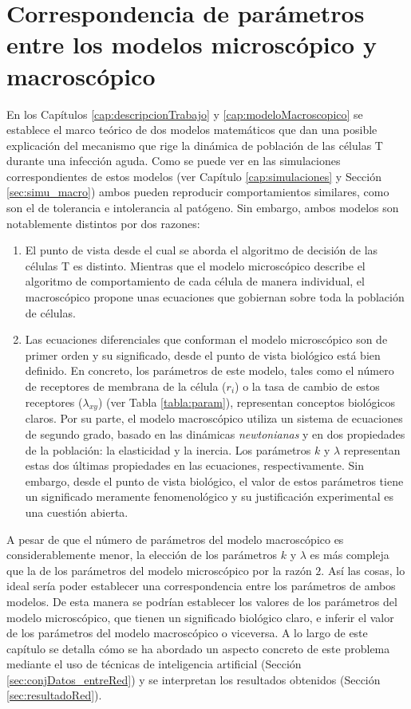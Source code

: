 \chapter{Correspondencia de parámetros entre los modelos microscópico y macroscópico}
\label{cap:redNeuronal}

En los Capítulos \ref{cap:descripcionTrabajo} y \ref{cap:modeloMacroscopico} se establece el marco teórico de dos modelos matemáticos que dan una posible explicación del mecanismo que rige la dinámica de población de las células T durante una infección aguda. Como se puede ver en las simulaciones correspondientes de estos modelos (ver Capítulo \ref{cap:simulaciones} y Sección \ref{sec:simu_macro}) ambos pueden reproducir comportamientos similares, como son el de tolerancia e intolerancia al patógeno. Sin embargo, ambos modelos son notablemente distintos por dos razones: 

\begin{enumerate}
	\item El punto de vista desde el cual se aborda el algoritmo de decisión de las células T es distinto. Mientras que el modelo microscópico describe el algoritmo de comportamiento de cada célula de manera individual, el macroscópico propone unas ecuaciones que gobiernan sobre toda la población de células. 
	
	\item Las ecuaciones diferenciales que conforman el modelo microscópico son de primer orden y su significado, desde el punto de vista biológico está bien definido. En concreto, los parámetros de este modelo, tales como el número de receptores de membrana de la célula ($r_{i}$) o la tasa de cambio de estos receptores ($\lambda_{xy}$) (ver Tabla \ref{tabla:param}), representan conceptos biológicos claros. Por su parte, el modelo macroscópico utiliza un sistema de ecuaciones de segundo grado, basado en las dinámicas \textit{newtonianas} y en dos propiedades de la población: la elasticidad y la inercia. Los parámetros $k$ y $\lambda$ representan estas dos últimas propiedades en las ecuaciones, respectivamente. Sin embargo, desde el punto de vista biológico, el valor de estos parámetros tiene un significado meramente fenomenológico y su justificación experimental es una cuestión abierta.
	 
\end{enumerate}

A pesar de que el número de parámetros del modelo macroscópico es considerablemente menor, la elección de los parámetros $k$ y $\lambda$ es más compleja que la de los parámetros del modelo microscópico por la razón $2$. Así las cosas, lo ideal sería poder establecer una correspondencia entre los parámetros de ambos modelos. De esta manera se podrían establecer los valores de los parámetros del modelo microscópico, que tienen un significado biológico claro, e inferir el valor de los parámetros del modelo macroscópico o viceversa. A lo largo de este capítulo se detalla cómo se ha abordado un aspecto concreto de este problema mediante el uso de técnicas de inteligencia artificial (Sección \ref{sec:conjDatos_entreRed}) y se interpretan los resultados obtenidos (Sección \ref{sec:resultadoRed}). 


